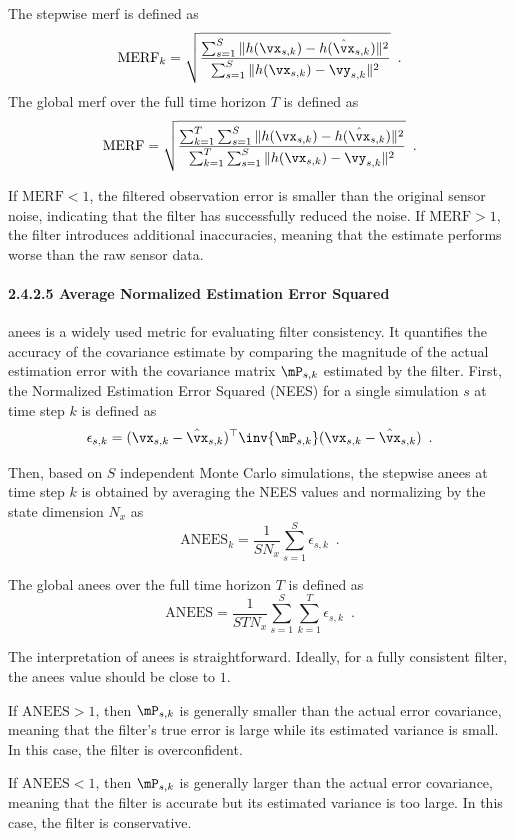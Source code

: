 The stepwise \ac{merf} is defined as
\begin{equation}
	\text{MERF}_k = \sqrt{ \frac{\sum_{s=1}^{S} \|h(\vx_{s,k}) - h(\hat{\vx}_{s,k})\|^2}{\sum_{s=1}^{S} \|h(\vx_{s,k}) - \vy_{s,k}\|^2} } \enspace.
\end{equation}
The global \ac{merf} over the full time horizon $T$ is defined as
\begin{equation}
	\text{MERF} = \sqrt{ \frac{\sum_{k=1}^{T} \sum_{s=1}^{S} \|h(\vx_{s,k}) - h(\hat{\vx}_{s,k})\|^2}{\sum_{k=1}^{T} \sum_{s=1}^{S} \|h(\vx_{s,k}) - \vy_{s,k}\|^2} } \enspace.
\end{equation}

If $\text{MERF} < 1$, the filtered observation error is smaller than the original sensor noise, indicating that the filter has successfully reduced the noise. If $\text{MERF} > 1$, the filter introduces additional inaccuracies, meaning that the estimate performs worse than the raw sensor data.

\paragraph{2.4.2.5 Average Normalized Estimation Error Squared}
\ac{anees} is a widely used metric for evaluating filter consistency. It quantifies the accuracy of the covariance estimate by comparing the magnitude of the actual estimation error with the covariance matrix $\mP_{s,k}$ estimated by the filter. First, the Normalized Estimation Error Squared (NEES) for a single simulation $s$ at time step $k$ is defined as
\begin{equation}
	\epsilon_{s,k} = (\vx_{s,k} - \hat{\vx}_{s,k})^{\top} \inv{\mP_{s,k}} (\vx_{s,k} - \hat{\vx}_{s,k}) \enspace.
\end{equation}

Then, based on $S$ independent Monte Carlo simulations, the stepwise \ac{anees} at time step $k$ is obtained by averaging the NEES values and normalizing by the state dimension $N_x$ as
\begin{equation}
	\text{ANEES}_k = \frac{1}{S N_x} \sum_{s=1}^{S} \epsilon_{s,k} \enspace.
\end{equation}

The global \ac{anees} over the full time horizon $T$ is defined as
\begin{equation}
	\text{ANEES} = \frac{1}{S T N_x} \sum_{s=1}^{S} \sum_{k=1}^{T} \epsilon_{s,k} \enspace.
\end{equation}

The interpretation of \ac{anees} is straightforward. Ideally, for a fully consistent filter, the \ac{anees} value should be close to $1$.

If $\text{ANEES} > 1$, then $\mP_{s,k}$ is generally smaller than the actual error covariance, meaning that the filter's true error is large while its estimated variance is small. In this case, the filter is overconfident.

If $\text{ANEES} < 1$, then $\mP_{s,k}$ is generally larger than the actual error covariance, meaning that the filter is accurate but its estimated variance is too large. In this case, the filter is conservative.